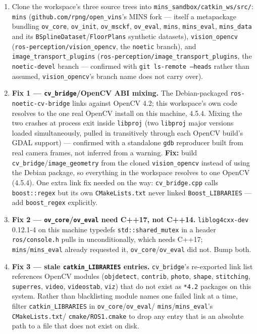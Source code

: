 \documentclass[11pt]{report}
\begin{document}
\begingroup\sloppy
\begin{enumerate}
  \item Clone the workspace's three source trees into
  \texttt{mins\_sandbox/catkin\_ws/src/}: \texttt{mins}
  (\texttt{github.com/rpng/open\_vins}'s MINS fork --- itself a metapackage
  bundling \texttt{ov\_core}, \texttt{ov\_init}, \texttt{ov\_msckf},
  \texttt{ov\_eval}, \texttt{mins}, \texttt{mins\_eval}, \texttt{mins\_data}
  and its \texttt{BSplineDataset}/\texttt{FloorPlans} synthetic datasets),
  \texttt{vision\_opencv} (\texttt{ros-perception/vision\_opencv}, the
  \texttt{noetic} branch), and \texttt{image\_transport\_plugins}
  (\texttt{ros-perception/image\_transport\_plugins}, the
  \texttt{noetic-devel} branch --- confirmed with \texttt{git ls-remote
  --heads} rather than assumed, \texttt{vision\_opencv}'s branch name does
  not carry over).

  \item \textbf{Fix 1 --- \texttt{cv\_bridge}/OpenCV ABI mixing.}
  The Debian-packaged \texttt{ros-noetic-cv-bridge} links against OpenCV
  4.2; this workspace's own code resolves to the one real OpenCV install on
  this machine, 4.5.4. Mixing the two crashes at process exit inside
  \texttt{libproj} (two \texttt{libproj} major versions loaded
  simultaneously, pulled in transitively through each OpenCV build's GDAL
  support) --- confirmed with a standalone \texttt{gdb} reproducer built
  from real camera frames, not inferred from a warning. \textbf{Fix:} build
  \texttt{cv\_bridge}/\texttt{image\_geometry} from the cloned
  \texttt{vision\_opencv} instead of using the Debian package, so everything
  in the workspace resolves to one OpenCV (4.5.4). One extra link fix needed
  on the way: \texttt{cv\_bridge.cpp} calls \texttt{boost::regex} but its
  own \texttt{CMakeLists.txt} never linked \texttt{Boost\_LIBRARIES} --- add
  \texttt{boost\_regex} explicitly.

  \item \textbf{Fix 2 --- \texttt{ov\_core}/\texttt{ov\_eval} need C++17,
  not C++14.} \texttt{liblog4cxx-dev} 0.12.1-4 on this machine typedefs
  \texttt{std::shared\_mutex} in a header \texttt{ros/console.h} pulls in
  unconditionally, which needs C++17; \texttt{mins}/\texttt{mins\_eval}
  already requested it, \texttt{ov\_core}/\texttt{ov\_eval} did not. Bump
  both.

  \item \textbf{Fix 3 --- stale \texttt{catkin\_LIBRARIES} entries.}
  \texttt{cv\_bridge}'s re-exported link list references OpenCV modules
  (\texttt{objdetect}, \texttt{contrib}, \texttt{photo}, \texttt{shape},
  \texttt{stitching}, \texttt{superres}, \texttt{video}, \texttt{videostab},
  \texttt{viz}) that do not exist as \texttt{*4.2} packages on this system.
  Rather than blacklisting module names one failed link at a time, filter
  \texttt{catkin\_LIBRARIES} in \texttt{ov\_core}/\texttt{ov\_eval}/
  \texttt{mins}/\texttt{mins\_eval}'s \texttt{CMakeLists.txt}/
  \texttt{cmake/ROS1.cmake} to drop any entry that is an absolute path to a
  file that does not exist on disk.


\end{enumerate}
\end{document}
